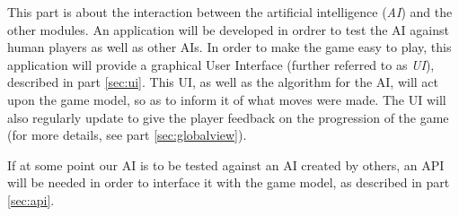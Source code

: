 This part is about the interaction between the artificial intelligence (\emph{AI}) and the other modules.
An application will be developed in ordrer to test the AI against human players as well as other AIs.
In order to make the game easy to play, this application will provide a graphical User Interface (further referred to as \emph{UI}), described in part \ref{sec:ui}.
This UI, as well as the algorithm for the AI, will act upon the game model, so as to inform it of what moves were made.
The UI will also regularly update to give the player feedback on the progression of the game (for more details, see part \ref{sec:globalview}).

If at some point our AI is to be tested against an AI created by others, an API will be needed in order to interface it with the game model, as described in part \ref{sec:api}.
